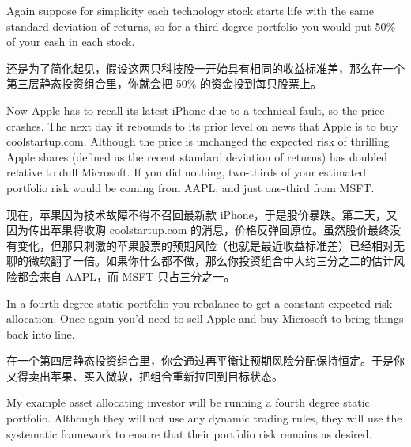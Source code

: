 \begin{englishblock} Again suppose for simplicity each technology stock starts life with the same standard deviation of returns, so for a third degree portfolio you would put 50\% of your cash in each stock. \end{englishblock}

\begin{chineseblock}还是为了简化起见，假设这两只科技股一开始具有相同的收益标准差，那么在一个第三层静态投资组合里，你就会把 50\% 的资金投到每只股票上。\end{chineseblock}

\bipairgap

\begin{englishblock} Now Apple has to recall its latest iPhone due to a technical fault, so the price crashes. The next day it rebounds to its prior level on news that Apple is to buy coolstartup.com. Although the price is unchanged the expected risk of thrilling Apple shares (defined as the recent standard deviation of returns) has doubled relative to dull Microsoft. If you did nothing, two-thirds of your estimated portfolio risk would be coming from AAPL, and just one-third from MSFT. \end{englishblock}

\begin{chineseblock}现在，苹果因为技术故障不得不召回最新款 iPhone，于是股价暴跌。第二天，又因为传出苹果将收购 coolstartup.com 的消息，价格反弹回原位。虽然股价最终没有变化，但那只刺激的苹果股票的预期风险（也就是最近收益标准差）已经相对无聊的微软翻了一倍。如果你什么都不做，那么你投资组合中大约三分之二的估计风险都会来自 AAPL，而 MSFT 只占三分之一。\end{chineseblock}

\bipairgap

\begin{englishblock} In a fourth degree static portfolio you rebalance to get a constant expected risk allocation. Once again you'd need to sell Apple and buy Microsoft to bring things back into line. \end{englishblock}

\begin{chineseblock}在一个第四层静态投资组合里，你会通过再平衡让预期风险分配保持恒定。于是你又得卖出苹果、买入微软，把组合重新拉回到目标状态。\end{chineseblock}

\bipairgap

\begin{englishblock} My example asset allocating investor will be running a fourth degree static portfolio. Although they will not use any dynamic trading rules, they will use the systematic framework to ensure that their portfolio risk remains as desired. \end{englishblock}

